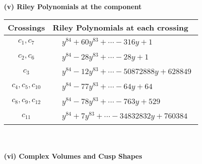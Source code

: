 \documentclass[1p]{elsarticle_modified}
\theoremstyle{definition}
\begin{document}
\newpage\renewcommand{\arraystretch}{1}
\flushleft \textbf{(v) Riley Polynomials at the component}\newline \\
\begin{tabular}{m{50pt}|m{274pt}}
Crossings & \hspace{64pt}Riley Polynomials at each crossing \\
\hline $$\begin{aligned}c_{1},c_{7}\end{aligned}$$&$\begin{aligned}
&y^{84}+60 y^{83}+\cdots-316 y+1
\end{aligned}$\\
\hline $$\begin{aligned}c_{2},c_{6}\end{aligned}$$&$\begin{aligned}
&y^{84}-28 y^{83}+\cdots-28 y+1
\end{aligned}$\\
\hline $$\begin{aligned}c_{3}\end{aligned}$$&$\begin{aligned}
&y^{84}-12 y^{83}+\cdots-50872888 y+628849
\end{aligned}$\\
\hline $$\begin{aligned}c_{4},c_{5},c_{10}\end{aligned}$$&$\begin{aligned}
&y^{84}-77 y^{83}+\cdots-64 y+64
\end{aligned}$\\
\hline $$\begin{aligned}c_{8},c_{9},c_{12}\end{aligned}$$&$\begin{aligned}
&y^{84}-78 y^{83}+\cdots-763 y+529
\end{aligned}$\\
\hline $$\begin{aligned}c_{11}\end{aligned}$$&$\begin{aligned}
&y^{84}+7 y^{83}+\cdots-34832832 y+760384
\end{aligned}$\\
\hline
\end{tabular}\\~\\
\newpage\flushleft \textbf{(vi) Complex Volumes and Cusp Shapes}
\end{document}
